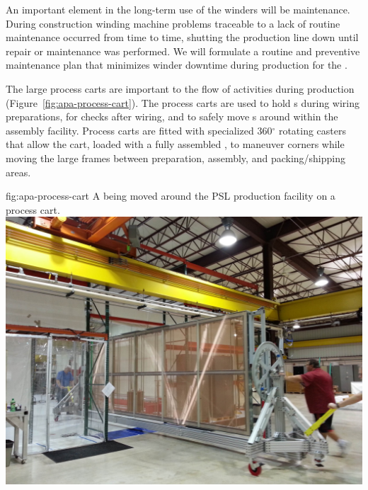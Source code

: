 An important element in the long-term use of the winders %
will be maintenance.  %
During  construction winding machine problems traceable to a lack of routine maintenance occurred from time to time, shutting the production line down until repair or maintenance was performed. We will formulate a routine and preventive maintenance plan that minimizes winder downtime during  production for the .

The large process carts are important to the %
flow of activities during production %
(Figure~\ref{fig:apa-process-cart}). The process carts are used to hold s during wiring preparations,  for  checks after wiring, and to safely move s around within the assembly facility. Process carts are fitted with specialized 360$^\circ$ rotating casters that allow the cart, loaded with a fully assembled , to maneuver corners while moving the large frames between preparation, assembly, and packing/shipping areas.

\begin{dunefigure}{fig:apa-process-cart}
{A   being moved around the PSL production facility on a process cart.}
\includegraphics[height=0.35\textheight,trim=50mm 10mm 70mm 250mm,clip]{graphics/sp-apa-process-cart.jpg}
\end{dunefigure}



